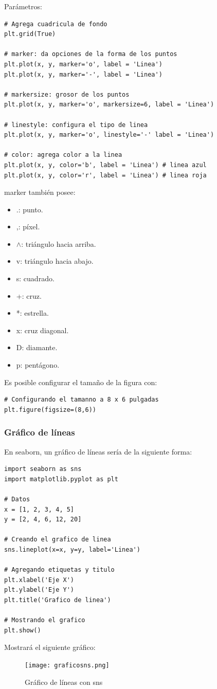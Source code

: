 \documentclass[a4paper, 12pt]{book}
\begin{document}
Parámetros:
\begin{verbatim}
# Agrega cuadricula de fondo
plt.grid(True)
	
# marker: da opciones de la forma de los puntos
plt.plot(x, y, marker='o', label = 'Linea')
plt.plot(x, y, marker='-', label = 'Linea')
	
# markersize: grosor de los puntos
plt.plot(x, y, marker='o', markersize=6, label = 'Linea')
	
# linestyle: configura el tipo de linea
plt.plot(x, y, marker='o', linestyle='-' label = 'Linea')
	
# color: agrega color a la linea
plt.plot(x, y, color='b', label = 'Linea') # linea azul
plt.plot(x, y, color='r', label = 'Linea') # linea roja
\end{verbatim}
marker también posee:
\begin{itemize}
	\item .: punto.
	\item ,: píxel.
	\item $\wedge$: triángulo hacia arriba.
	\item v: triángulo hacia abajo.
	\item s: cuadrado.
	\item +: cruz.
	\item *: estrella.
	\item x: cruz diagonal.
	\item D: diamante.
	\item p: pentágono.
\end{itemize}

Es posible configurar el tamaño de la figura con:
\begin{verbatim}
# Configurando el tamanno a 8 x 6 pulgadas
plt.figure(figsize=(8,6))
\end{verbatim}

\subsubsection{Gráfico de líneas}
En seaborn, un gráfico de líneas sería de la siguiente forma:
\begin{verbatim}
import seaborn as sns
import matplotlib.pyplot as plt

# Datos
x = [1, 2, 3, 4, 5]
y = [2, 4, 6, 12, 20]

# Creando el grafico de linea
sns.lineplot(x=x, y=y, label='Linea')

# Agregando etiquetas y titulo
plt.xlabel('Eje X')
plt.ylabel('Eje Y')
plt.title('Grafico de linea')

# Mostrando el grafico
plt.show()
\end{verbatim}
Mostrará el siguiente gráfico:
\begin{figure}[H] 
	\centering 
	\texttt{[image: graficosns.png]}
	\caption{Gráfico de líneas con sns}
\end{figure}
\end{document}
